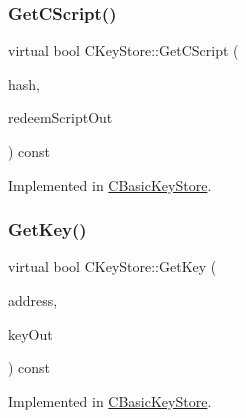 \mbox{\label{class_c_key_store_ae6bf4dbeb0705e199250e48aa5d34264}} 
\subsubsection{\texorpdfstring{Get\+C\+Script()}{GetCScript()}}
{\footnotesize\ttfamily virtual bool C\+Key\+Store\+::\+Get\+C\+Script (\begin{DoxyParamCaption}\item[{const C\+Script\+ID \&}]{hash,  }\item[{C\+Script \&}]{redeem\+Script\+Out }\end{DoxyParamCaption}) const\hspace{0.3cm}{\ttfamily [pure virtual]}}



Implemented in \mbox{\hyperlink{class_c_basic_key_store_a975abe0f2efa3e0e2270d3714d73010a}{C\+Basic\+Key\+Store}}.

\mbox{\label{class_c_key_store_a2dffca468fef2e5da2e42a7c983d968a}} 
\subsubsection{\texorpdfstring{Get\+Key()}{GetKey()}}
{\footnotesize\ttfamily virtual bool C\+Key\+Store\+::\+Get\+Key (\begin{DoxyParamCaption}\item[{const \mbox{\hyperlink{class_c_key_i_d}{C\+Key\+ID}} \&}]{address,  }\item[{\mbox{\hyperlink{class_c_key}{C\+Key}} \&}]{key\+Out }\end{DoxyParamCaption}) const\hspace{0.3cm}{\ttfamily [pure virtual]}}



Implemented in \mbox{\hyperlink{class_c_basic_key_store_a69328ee642e4234922356f59876e956d}{C\+Basic\+Key\+Store}}.

\mbox{\label{class_c_key_store_aca5044014720308f191113e7ba297d13}} 
